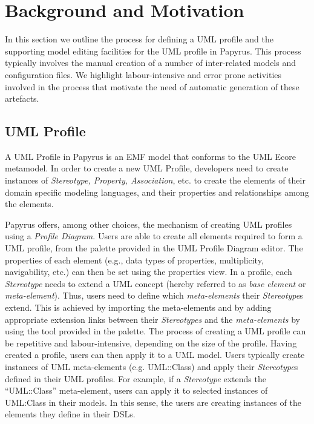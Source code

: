 \section{Background and Motivation}
\label{sec:background}

In this section we outline the process for defining a UML profile and the supporting model editing facilities for the UML profile in Papyrus. 
This process typically involves the manual creation of a number of inter-related models and configuration files.
We highlight labour-intensive and error prone activities involved in the process that motivate the need of automatic generation of these artefacts.

\subsection{UML Profile}
A UML Profile in Papyrus is an EMF model that conforms to the UML Ecore metamodel. 
In order to create a new UML Profile, developers need to create instances of \textit{Stereotype, Property, Association}, etc. to create the elements of their domain specific modeling languages, and their properties and relationships among the elements.

Papyrus offers, among other choices, the mechanism of creating UML profiles using a \textit{Profile Diagram}. 
Users are able to create all elements required to form a UML profile, from the palette provided in the UML Profile Diagram editor.
The properties of each element (e.g., data types of properties, multiplicity, navigability, etc.) can then be set using the properties view. 
In a profile, each \textit{Stereotype} needs to extend a UML concept (hereby referred to as \textit{base element} or \textit{meta-element}). 
Thus, users need to define which \textit{meta-elements} their \textit{Stereotype}s extend. 
This is achieved by importing the meta-elements and by adding appropriate extension links between their \textit{Stereotypes} and the \textit{meta-elements} by using the tool provided in the palette.
The process of creating a UML profile can be repetitive and labour-intensive, depending on the size of the profile.
Having created a profile, users can then apply it to a UML model. 
Users typically create instances of UML meta-elements (e.g. UML::Class) and apply their \textit{Stereotype}s defined in their UML profiles. 
For example, if a \textit{Stereotype} extends the ``UML::Class'' meta-element, users can apply it to selected instances of UML:Class in their models. 
In this sense, the users are creating instances of the elements they define in their DSLs. 

